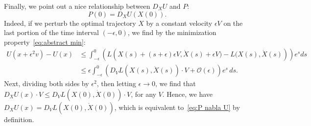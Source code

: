 \documentclass[AHL,Unicode,longabstracts]{cedram}
\newcommand{\mO}{\mathcal{O}}
\newcommand{\1}{\mathds{1}}
\begin{document}
Finally, we point out a nice relationship between $D_X U$ and $P$:
\begin{equation}\label{eq:P nabla U}
P(0) = D_X U (X(0)).
\end{equation}
Indeed, if we perturb the optimal trajectory $X$ by a constant velocity $\epsilon V$ on the last portion of the time interval $(-\epsilon,0)$, we find by the minimization property~\eqref{eq:abstract min}:
\begin{align*}
U(x + \epsilon^2 v) - U(x) &\leq \int_{-\epsilon}^0\left(L\left(X(s) + (s+\epsilon)\epsilon V, \dot X(s) + \epsilon V) - L(X(s), \dot X(s)\right) \right) e^s ds\\
& \leq \epsilon \int_{-\epsilon}^0\left(D_V L\left(X(s),\dot X(s)\right)\cdot V + \mO(\epsilon)\right) e^s\, ds.
\end{align*}
Next, dividing both sides by $\epsilon^2$, then letting $\epsilon\to 0$, we find that $D_XU(x) \cdot V \leq D_V L(X(0),\dot X(0))\cdot V$, for any $V$. Hence, we have $D_XU(x) = D_V L(X(0),\dot X(0))$, which is equivalent to~\eqref{eq:P nabla U} by definition.
\end{document}
